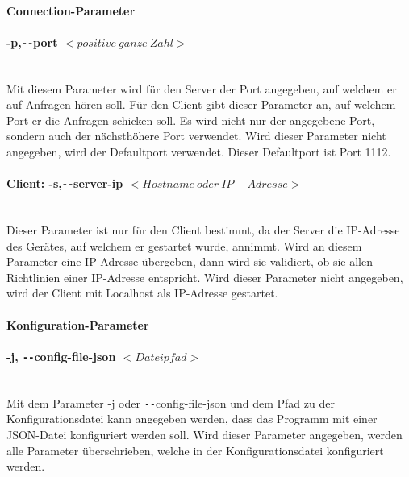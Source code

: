 \paragraph{Connection-Parameter}

\paragraph{-p,\texttt{-{}-}port $<positive \: ganze \: Zahl>$} \mbox{} \vspace{2mm} \\
Mit diesem Parameter wird für den Server der Port angegeben, auf welchem er auf Anfragen hören soll. Für den Client gibt dieser Parameter an, auf welchem Port er die Anfragen schicken soll. Es wird nicht nur der angegebene Port, sondern auch der nächsthöhere Port verwendet. Wird dieser Parameter nicht angegeben, wird der Defaultport verwendet. Dieser Defaultport ist Port 1112.

\paragraph{Client: -s,\texttt{-{}-}server-ip $<Hostname \: oder \: IP-Adresse>$} \mbox{} \vspace{2mm} \\
Dieser Parameter ist nur für den Client bestimmt, da der Server die IP-Adresse des Gerätes, auf welchem er gestartet wurde, annimmt. Wird an diesem Parameter eine IP-Adresse übergeben, dann wird sie validiert, ob sie allen Richtlinien einer IP-Adresse entspricht. Wird dieser Parameter nicht angegeben, wird der Client mit Localhost als IP-Adresse gestartet.

\paragraph{Konfiguration-Parameter}

\paragraph{-j, \texttt{-{}-}config-file-json $<Dateipfad>$} \mbox{} \vspace{2mm} \\
Mit dem Parameter -j oder \texttt{-{}-}config-file-json und dem Pfad zu der Konfigurationsdatei kann angegeben werden, dass das Programm mit einer JSON-Datei konfiguriert werden soll. Wird dieser Parameter angegeben, werden alle Parameter überschrieben, welche in der Konfigurationsdatei konfiguriert werden.

